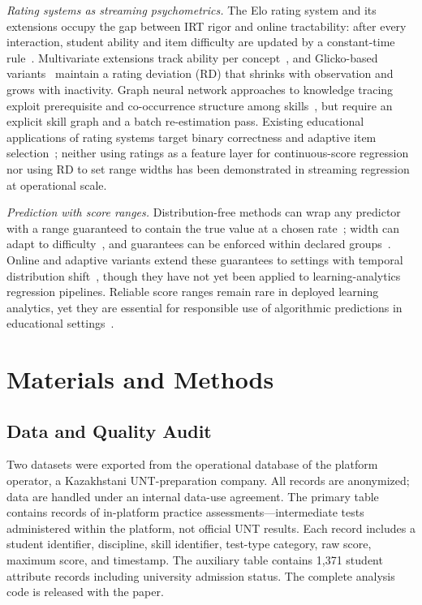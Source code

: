 \documentclass[11pt]{article}
\begin{document}
\textit{Rating systems as streaming psychometrics.}\quad
The Elo rating system and its extensions occupy the gap between IRT rigor and online
tractability: after every interaction, student ability and item difficulty are updated by a
constant-time rule~\cite{klinkenberg2011,pelanek2016}.
Multivariate extensions track ability per concept~\cite{abdi2019}, and Glicko-based
variants~\cite{abdi2021,glickman1999} maintain a rating deviation (RD) that shrinks with
observation and grows with inactivity.
Graph neural network approaches to knowledge tracing exploit prerequisite and co-occurrence
structure among skills~\cite{nakagawa2019,tong2020}, but require an explicit skill graph
and a batch re-estimation pass.
Existing educational applications of rating systems target binary correctness and adaptive
item selection~\cite{settles2016}; neither using ratings as a feature layer for continuous-score
regression nor using RD to set range widths has been demonstrated in
streaming regression at operational scale.

\textit{Prediction with score ranges.}\quad
Distribution-free methods can wrap any predictor with a range guaranteed to contain the
true value at a chosen rate~\cite{vovk2005,angelopoulos2023}; width can adapt to
difficulty~\cite{romano2019,rossellini2024}, and guarantees can be enforced within declared
groups~\cite{vovk2005}.
Online and adaptive variants extend these guarantees to settings with temporal
distribution shift~\cite{gibbs2021,zaffran2022}, though they have not yet been applied
to learning-analytics regression pipelines.
Reliable score ranges remain rare in deployed learning analytics,
yet they are essential for responsible use of algorithmic predictions in educational
settings~\cite{angelopoulos2023,kapoor2023}.

\section{Materials and Methods}

\subsection{Data and Quality Audit}

\begin{sloppypar}
Two datasets were exported from the operational database of the platform operator, a Kazakhstani
UNT-preparation company.
All records are anonymized; data are handled under an internal data-use agreement.
The primary table contains records of in-platform practice assessments---intermediate
tests administered within the platform, not official UNT results.
Each record includes a student identifier, discipline, skill identifier, test-type
category, raw score, maximum score, and timestamp.
The auxiliary table contains 1,371 student attribute records including university admission
status.  The complete analysis code is released with the paper.
\end{sloppypar}
\end{document}
